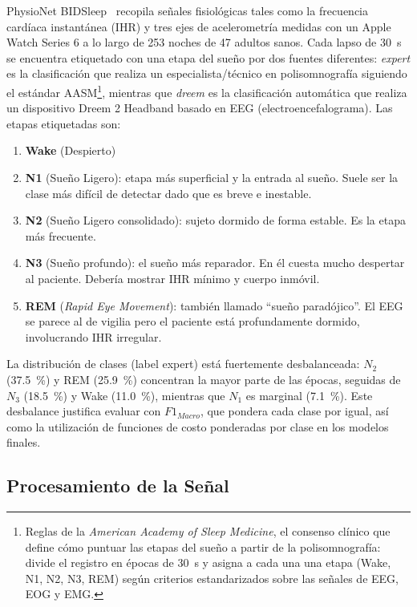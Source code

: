 \documentclass[conference]{IEEEtran}
\begin{document}
PhysioNet BIDSleep~\cite{bidsleep} recopila señales fisiológicas tales como la frecuencia cardíaca instantánea (IHR) y tres ejes de acelerometría medidas con un Apple Watch Series 6 a lo largo de 253 noches de 47 adultos sanos. Cada lapso de \qty{30}{\second} se encuentra etiquetado con una etapa del sueño por dos fuentes diferentes: \emph{expert} es la clasificación que realiza un especialista/técnico en polisomnografía siguiendo el estándar AASM\footnote{Reglas de la \emph{American Academy of Sleep Medicine}, el consenso clínico que define cómo puntuar las etapas del sueño a partir de la polisomnografía: divide el registro en épocas de \qty{30}{\second} y asigna a cada una una etapa (Wake, N1, N2, N3, REM) según criterios estandarizados sobre las señales de EEG, EOG y EMG.}, mientras que \emph{dreem} es la clasificación automática que realiza un dispositivo Dreem 2 Headband basado en EEG (electroencefalograma). Las etapas etiquetadas son:
\begin{enumerate}[start=0]
    \item \textbf{Wake} (Despierto)
    \item \textbf{N1} (Sueño Ligero): etapa más superficial y la entrada al sueño. Suele ser la clase más difícil de detectar dado que es breve e inestable.
    \item \textbf{N2} (Sueño Ligero consolidado): sujeto dormido de forma estable. Es la etapa más frecuente.
    \item \textbf{N3} (Sueño profundo): el sueño más reparador. En él cuesta mucho despertar al paciente. Debería mostrar IHR mínimo y cuerpo inmóvil.
    \item \textbf{REM} (\emph{Rapid Eye Movement}): también llamado ``sueño paradójico''. El EEG se parece al de vigilia pero el paciente está profundamente dormido, involucrando IHR irregular.
\end{enumerate}

La distribución de clases (label expert) está fuertemente desbalanceada: $N_2$ (\qty{37.5}{\percent}) y REM (\qty{25.9}{\percent}) concentran la mayor parte de las épocas, seguidas de $N_3$ (\qty{18.5}{\percent}) y Wake (\qty{11.0}{\percent}), mientras que $N_1$ es marginal (\qty{7.1}{\percent}). Este desbalance justifica evaluar con $F1_{Macro}$, que pondera cada clase por igual, así como la utilización de funciones de costo ponderadas por clase en los modelos finales.

\subsection{Procesamiento de la Señal}\label{sec:proc_senal}
\end{document}
